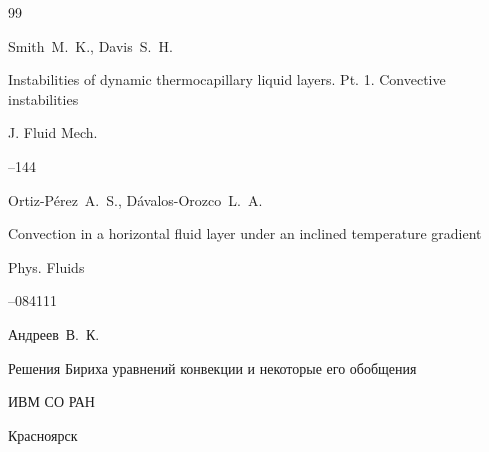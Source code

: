 \begin{thebibliography}{99}








\by Smith~M.~K., Davis~S.~H.

\paper Instabilities of dynamic thermocapillary liquid layers. Pt. 1. Convective instabilities

\jour J. Fluid Mech.



--144





\by Ortiz-P\'{e}rez~A.~S., D\'{a}valos-Orozco~L.~A.

\paper Convection in a horizontal fluid layer under an inclined temperature gradient

\jour Phys. Fluids




–084111







\by Андреев~В.~К.

\book Решения Бириха уравнений конвекции и некоторые его обобщения


\publ ИВМ СО РАН

\publaddr Красноярск













\end{thebibliography}
